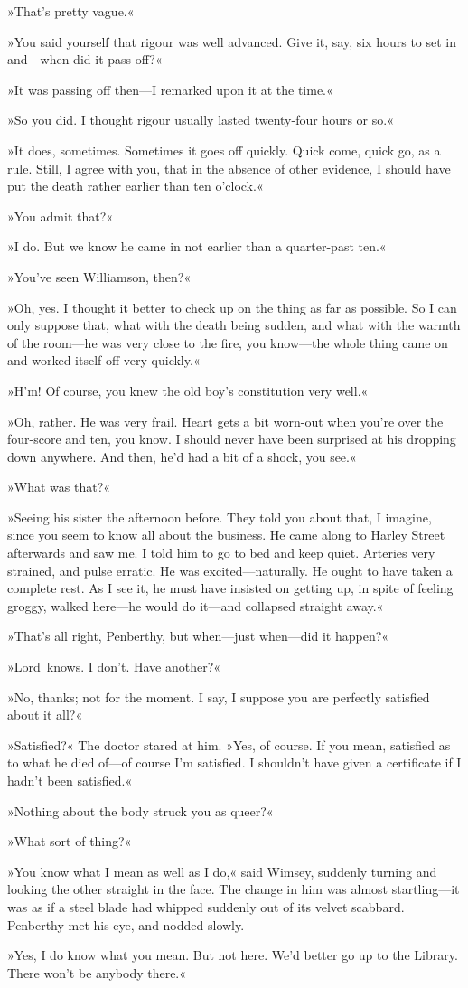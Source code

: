 »That's pretty vague.«

»You said yourself that rigour was well advanced. Give it, say, six hours to set in and—when did it pass off?«

»It was passing off then—I remarked upon it at the time.«

»So you did. I thought rigour usually lasted twenty-four hours or so.«

»It does, sometimes. Sometimes it goes off quickly. Quick come, quick go, as a rule. Still, I agree with you, that in the absence of other evidence, I should have put the death rather earlier than ten o'clock.«

»You admit that?«

»I do. But we know he came in not earlier than a quarter-past ten.«

»You've seen Williamson, then?«

»Oh, yes. I thought it better to check up on the thing as far as possible. So I can only suppose that, what with the death being sudden, and what with the warmth of the room—he was very close to the fire, you know—the whole thing came on and worked itself off very quickly.«

»H'm! Of course, you knew the old boy's constitution very well.«

»Oh, rather. He was very frail. Heart gets a bit worn-out when you're over the four-score and ten, you know. I should never have been surprised at his dropping down anywhere. And then, he'd had a bit of a shock, you see.«

»What was that?«

»Seeing his sister the afternoon before. They told you about that, I imagine, since you seem to know all about the business. He came along to Harley Street afterwards and saw me. I told him to go to bed and keep quiet. Arteries very strained, and pulse erratic. He was excited—naturally. He ought to have taken a complete rest. As I see it, he must have insisted on getting up, in spite of feeling groggy, walked here—he would do it—and collapsed straight away.«

»That's all right, Penberthy, but when—just when—did it happen?«

»Lord~knows. I don't. Have another?«

»No, thanks; not for the moment. I say, I suppose you are perfectly satisfied about it all?«

»Satisfied?« The doctor stared at him. »Yes, of course. If you mean, satisfied as to what he died of—of course I'm satisfied. I shouldn't have given a certificate if I hadn't been satisfied.«

»Nothing about the body struck you as queer?«

»What sort of thing?«

»You know what I mean as well as I do,« said Wimsey, suddenly turning and looking the other straight in the face. The change in him was almost startling—it was as if a steel blade had whipped suddenly out of its velvet scabbard. Penberthy met his eye, and nodded slowly.

»Yes, I do know what you mean. But not here. We'd better go up to the Library. There won't be anybody there.«